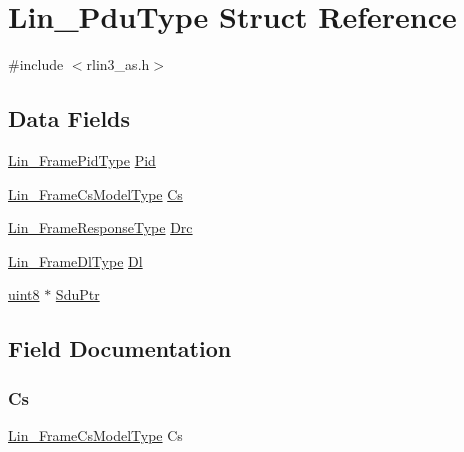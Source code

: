\hypertarget{struct_lin___pdu_type}{}\section{Lin\+\_\+\+Pdu\+Type Struct Reference}
\label{struct_lin___pdu_type}


{\ttfamily \#include $<$rlin3\+\_\+as.\+h$>$}

\subsection*{Data Fields}
\begin{DoxyCompactItemize}
\item 
\mbox{\hyperlink{rlin3__as_8h_a80d617a47697e424c9d43c93cd94e41d}{Lin\+\_\+\+Frame\+Pid\+Type}} \mbox{\hyperlink{struct_lin___pdu_type_a5313595b56f8a1b6dede131ac01e3d5e}{Pid}}
\item 
\mbox{\hyperlink{rlin3__as_8h_afe226f11d7db44f8b0d1ee2d7de6692c}{Lin\+\_\+\+Frame\+Cs\+Model\+Type}} \mbox{\hyperlink{struct_lin___pdu_type_a4d564b9deb50686801bf2c9ac257e49d}{Cs}}
\item 
\mbox{\hyperlink{rlin3__as_8h_a6e5feaa07b3570a91638a47f6ee3b8bd}{Lin\+\_\+\+Frame\+Response\+Type}} \mbox{\hyperlink{struct_lin___pdu_type_af7d159ff5319d6860e80fbda95487eb3}{Drc}}
\item 
\mbox{\hyperlink{rlin3__as_8h_a3c23959006124180647bc24d62a976c2}{Lin\+\_\+\+Frame\+Dl\+Type}} \mbox{\hyperlink{struct_lin___pdu_type_a6aae2e73c9c9af39af956a51d1962557}{Dl}}
\item 
\mbox{\hyperlink{rlin3__as_8h_a0a75bc6cad2d642d99f9f41545137f03}{uint8}} $\ast$ \mbox{\hyperlink{struct_lin___pdu_type_a4e013762496e2e230972ba73f29f4ea6}{Sdu\+Ptr}}
\end{DoxyCompactItemize}


\subsection{Field Documentation}
\mbox{\label{struct_lin___pdu_type_a4d564b9deb50686801bf2c9ac257e49d}} 
\subsubsection{\texorpdfstring{Cs}{Cs}}
{\footnotesize\ttfamily \mbox{\hyperlink{rlin3__as_8h_afe226f11d7db44f8b0d1ee2d7de6692c}{Lin\+\_\+\+Frame\+Cs\+Model\+Type}} Cs}


